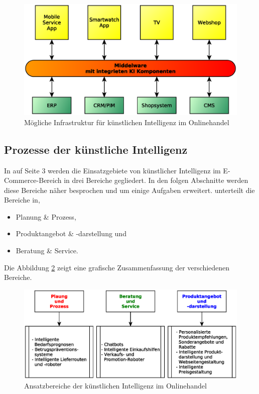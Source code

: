 \begin{figure}[!ht]
	\centering
	\includegraphics[width=\linewidth]{images/ecommerce-eco-system.eps}
	\caption{Mögliche Infrastruktur für künstlichen Intelligenz im Onlinehandel}
	\label{img:infrastructor_for_ai_in_e__commerce}
\end{figure}

\subsection{Prozesse der künstliche Intelligenz}
In \cite{glaess2018kuenstliche} auf Seite 3 werden die Einsatzgebiete von künstlicher Intelligenz im E-Commerce-Bereich in drei Bereiche gegliedert. In den folgen Abschnitte werden diese Bereiche näher besprochen und um einige Aufgaben erweitert. \cite{glaess2018kuenstliche} unterteilt die Bereiche in,

\begin{itemize}
	\item Planung \& Prozess,
	\item Produktangebot \& -darstellung und
	\item Beratung \& Service.
\end{itemize}

Die Abbildung \ref{img:areas_of_application_for_ai_in_e__commerce} zeigt eine grafische Zusammenfassung der verschiedenen Bereiche.

\begin{figure}[!ht]
	\centering
	\includegraphics[width=\linewidth]{images/ki-bereiche_glaess.eps}
	\caption{Ansatzbereiche der künstlichen Intelligenz im Onlinehandel}
	\label{img:areas_of_application_for_ai_in_e__commerce}
\end{figure}

